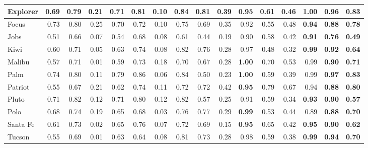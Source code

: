 \begin{table*}[th]
\begin{tabular}{|l|r|r|r|r|r|r|r|r|r|r|r|r|r|r|r|}
\hline
  Explorer &      0.69  &      0.79  &      0.21  &      0.71  &      0.81  &      0.10  &      0.84  &      0.81  &      0.39  &      0.95  &      0.61  &      0.46  & {\bf 1.00 } & {\bf 0.96 } & {\bf 0.83 } \\
\hline
     Focus &      0.73  &      0.80  &      0.25  &      0.70  &      0.72  &      0.10  &      0.75  &      0.69  &      0.35  &      0.92  &      0.55  &      0.48  & {\bf 0.94 } & {\bf 0.88 } & {\bf 0.78 } \\
\hline
      Jobs &      0.51  &      0.66  &      0.07  &      0.54  &      0.68  &      0.08  &      0.61  &      0.44  &      0.19  &      0.90  &      0.58  &      0.42  & {\bf 0.91 } & {\bf 0.76 } & {\bf 0.49 } \\
\hline
      Kiwi &      0.60  &      0.71  &      0.05  &      0.63  &      0.74  &      0.08  &      0.82  &      0.76  &      0.28  &      0.97  &      0.48  &      0.32  & {\bf 0.99 } & {\bf 0.92 } & {\bf 0.64 } \\
\hline
    Malibu &      0.57  &      0.71  &      0.01  &      0.59  &      0.73  &      0.18  &      0.70  &      0.67  &      0.28  & {\bf 1.00 } &      0.70  &      0.53  &      0.99  & {\bf 0.90 } & {\bf 0.71 } \\
\hline
      Palm &      0.74  &      0.80  &      0.11  &      0.79  &      0.86  &      0.06  &      0.84  &      0.50  &      0.23  & {\bf 1.00 } &      0.59  &      0.39  &      0.99  & {\bf 0.97 } & {\bf 0.83 } \\
\hline
   Patriot &      0.55  &      0.67  &      0.21  &      0.62  &      0.74  &      0.11  &      0.72  &      0.72  &      0.42  & {\bf 0.95 } &      0.79  &      0.67  &      0.94  & {\bf 0.88 } & {\bf 0.80 } \\
\hline
     Pluto &      0.71  &      0.82  &      0.12  &      0.71  &      0.80  &      0.12  &      0.82  &      0.57  &      0.25  &      0.91  &      0.59  &      0.34  & {\bf 0.93 } & {\bf 0.90 } & {\bf 0.57 } \\
\hline
      Polo &      0.68  &      0.74  &      0.19  &      0.65  &      0.68  &      0.03  &      0.76  &      0.77  &      0.29  & {\bf 0.99 } &      0.53  &      0.44  &      0.89  & {\bf 0.88 } & {\bf 0.70 } \\
\hline
  Santa Fe &      0.61  &      0.73  &      0.02  &      0.65  &      0.76  &      0.07  &      0.72  &      0.69  &      0.15  & {\bf 0.95 } &      0.65  &      0.42  & {\bf 0.95 } & {\bf 0.90 } & {\bf 0.62 } \\
\hline
    Tucson &      0.55  &      0.69  &      0.01  &      0.63  &      0.64  &      0.08  &      0.81  &      0.73  &      0.28  &      0.98  &      0.59  &      0.38  & {\bf 0.99 } & {\bf 0.94 } & {\bf 0.70 } \\

\end{tabular}
\end{table*}
